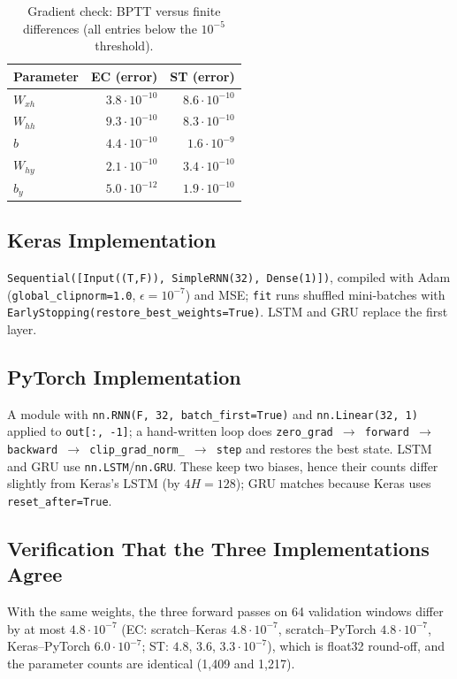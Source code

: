 \documentclass[11pt, a4paper]{article}
\begin{document}
\begin{table}[H]
\centering
\caption{Gradient check: BPTT versus finite differences (all entries below the $10^{-5}$ threshold).}
\small
\begin{tabular}{lrr}
\toprule
Parameter & EC (error) & ST (error) \\
\midrule
$W_{xh}$ & $3.8\cdot10^{-10}$ & $8.6\cdot10^{-10}$ \\
$W_{hh}$ & $9.3\cdot10^{-10}$ & $8.3\cdot10^{-10}$ \\
$b$ & $4.4\cdot10^{-10}$ & $1.6\cdot10^{-9}$ \\
$W_{hy}$ & $2.1\cdot10^{-10}$ & $3.4\cdot10^{-10}$ \\
$b_y$ & $5.0\cdot10^{-12}$ & $1.9\cdot10^{-10}$ \\
\bottomrule
\end{tabular}
\end{table}

\subsection{Keras Implementation}

\texttt{Sequential([Input((T,F)), SimpleRNN(32), Dense(1)])}, compiled with Adam (\texttt{global\_clipnorm=1.0}, $\epsilon=10^{-7}$) and MSE;
\texttt{fit} runs shuffled mini-batches with \texttt{EarlyStopping(restore\_best\_weights=True)}. LSTM and GRU replace the first layer.

\subsection{PyTorch Implementation}

A module with \texttt{nn.RNN(F, 32, batch\_first=True)} and \texttt{nn.Linear(32, 1)} applied to \texttt{out[:, -1]}; a hand-written loop does
\texttt{zero\_grad $\to$ forward $\to$ backward $\to$ clip\_grad\_norm\_ $\to$ step} and restores the best state. LSTM and GRU use \texttt{nn.LSTM}/\texttt{nn.GRU}.
These keep two biases, hence their counts differ slightly from Keras's LSTM (by $4H=128$); GRU matches because Keras uses \texttt{reset\_after=True}.

\subsection{Verification That the Three Implementations Agree}

With the same weights, the three forward passes on 64 validation windows differ by at most $4.8\cdot10^{-7}$ (EC: scratch--Keras $4.8\cdot10^{-7}$, scratch--PyTorch $4.8\cdot10^{-7}$,
Keras--PyTorch $6.0\cdot10^{-7}$; ST: $4.8$, $3.6$, $3.3\cdot10^{-7}$), which is float32 round-off, and the parameter counts are identical (1{,}409 and 1{,}217).
\end{document}
